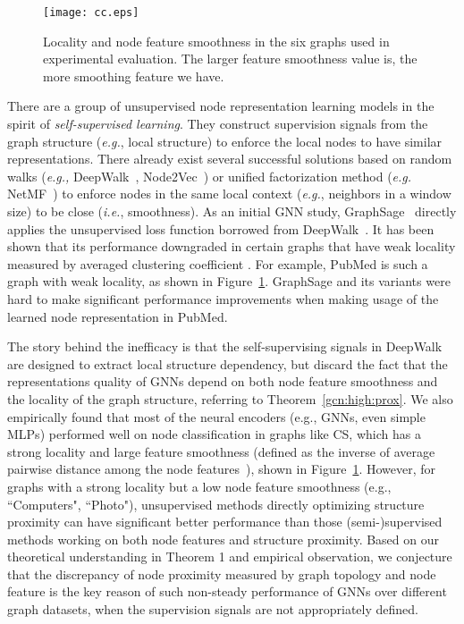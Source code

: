 \documentclass[preprint]{article}
\begin{document}
\begin{figure}
\label{fig:loc:cc}
\centering
\texttt{[image: cc.eps]}
\vspace{-0.2cm}
\caption{Locality and node feature smoothness in the six graphs used in experimental evaluation. The larger feature smoothness value is, the more smoothing feature we have.}
\end{figure}

There are a group of unsupervised node representation learning models in the spirit of \emph{self-supervised learning}. They   construct supervision signals   from the graph structure (\emph{e.g.}, local structure) to enforce the local nodes to have similar representations. There already exist several successful solutions based on random walks (\emph{e.g.,} DeepWalk~\cite{perozzi2014deepwalk}, Node2Vec~\cite{grover2016node2vec}) or unified factorization method (\emph{e.g.} NetMF~\cite{qiu2018network}) to enforce nodes in the same local context (\emph{e.g.}, neighbors in a window size) to be close (\emph{i.e.}, smoothness). As an initial GNN study, GraphSage~\cite{hamilton2017inductive} directly applies the unsupervised loss function borrowed from DeepWalk~\cite{perozzi2014deepwalk}. It has been shown  that its performance downgraded in certain graphs that have weak locality measured by averaged clustering coefficient \cite{saramaki2007generalizations}. For example, PubMed is such a graph with weak locality, as shown in Figure~\ref{fig:loc:cc}. GraphSage and its variants were hard to make significant performance improvements when making usage of  the learned   node representation in PubMed.

The story behind the   inefficacy is that
the self-supervising signals in DeepWalk are designed to extract local structure dependency, but discard the fact that the representations quality of GNNs depend on both node feature smoothness and the locality of the graph structure, referring to Theorem~\ref{gcn:high:prox}. We also empirically found that most of the neural encoders (e.g., GNNs, even simple MLPs) performed well on   node classification   in graphs like CS, which has a strong locality and 
 large feature smoothness (defined as the inverse of average pairwise distance among the node features~\cite{Hou2020Measuring}), shown in Figure~\ref{fig:loc:cc}. However, for graphs with a strong locality but a low node feature smoothness (e.g.,  ``Computers", ``Photo"), unsupervised methods directly optimizing structure proximity can have significant better performance than those   (semi-)supervised methods working on both node features and structure proximity. Based on our theoretical understanding in Theorem 1 and empirical observation, we conjecture that the discrepancy of node proximity measured by graph topology and node 
feature is the key reason of such non-steady performance of GNNs over different graph datasets, when the supervision signals are not appropriately defined.
\end{document}
